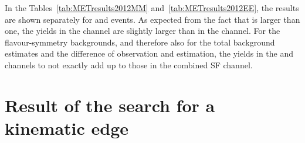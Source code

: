 
In the Tables~\ref{tab:METresults2012MM} and~\ref{tab:METresults2012EE}, the results are shown separately for \EE and \MM events. As expected from the fact that \rmue is larger than one, the yields in the \MM channel are slightly larger than in the \EE channel. For the flavour-symmetry backgrounds, and therefore also for the total background estimates and the difference of observation and estimation, the yields in the \EE and \MM channels to not exactly add up to those in the combined SF channel.  




\section{Result of the search for a kinematic edge}
